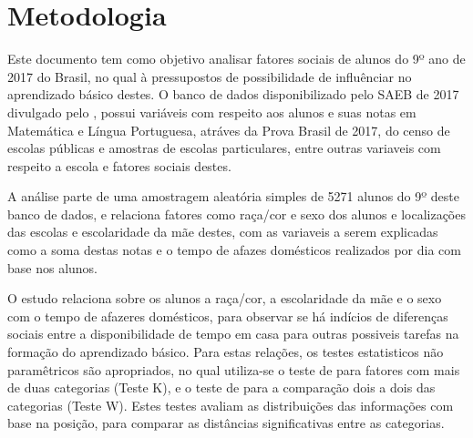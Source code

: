 


\chapter{Metodologia}

Este documento tem como objetivo analisar fatores sociais de alunos do 9º ano de 2017 do Brasil,
no qual à pressupostos de possibilidade de influênciar no aprendizado básico destes. O banco de dados
disponibilizado pelo SAEB de 2017 divulgado pelo , possui variáveis com respeito
aos alunos e suas notas em Matemática e Língua Portuguesa, atráves da Prova Brasil de 2017, do censo de 
escolas públicas e amostras de escolas particulares, entre outras variaveis com respeito a escola e fatores
sociais destes.

A análise parte de uma amostragem aleatória simples de 5271 alunos do 9º deste banco de dados, e relaciona 
fatores como raça/cor e sexo dos alunos e localizações das escolas e escolaridade da mãe destes, com as variaveis
a serem explicadas como a soma destas notas e o tempo de afazes domésticos realizados por dia com base nos alunos.

O estudo relaciona sobre os alunos a raça/cor, a escolaridade da mãe e o sexo com o tempo de afazeres domésticos, 
para observar se há indícios de diferenças sociais entre a disponibilidade de tempo em casa para outras possiveis 
tarefas na formação do aprendizado básico. Para estas relações, os testes estatisticos não paramêtricos são apropriados,
no qual utiliza-se o teste de  para fatores com mais de duas categorias (Teste K), e o
teste de  para a comparação dois a dois das categorias (Teste W). Estes testes avaliam as
distribuições das informações com base na posição, para comparar as distâncias significativas entre as categorias.

